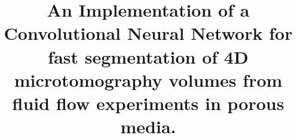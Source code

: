 \documentclass[draft,linenumbers]{agujournal2018}
\begin{document}
%
%


\title{An Implementation of a Convolutional Neural Network for fast segmentation of 4D microtomography volumes from fluid flow experiments in porous media.}

%
%










\end{document}

